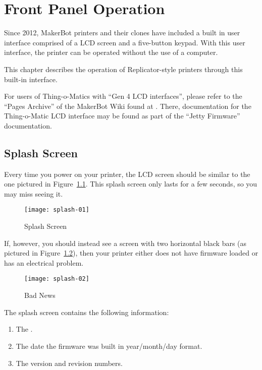 
\chapter{Front Panel Operation}\label{chap:whatever}

Since 2012, MakerBot printers and their clones have included a built in user
interface comprised of a \gls{LCD} screen and a five-button keypad.  With this
user interface, the printer can be operated without the use of a computer.

This chapter describes the operation of Replicator-style printers through this
built-in interface.

For users of Thing-o-Matics with ``Gen 4 LCD interfaces'', please refer
to the ``Pages Archive'' of the MakerBot Wiki found at
.  There, documentation for the Thing-o-Matic
LCD interface may be found as part of the ``\gls{Jetty Firmware}''
documentation.


\section{Splash Screen}\label{sec:Splash}

Every time you power on your printer, the \gls{LCD} screen should be similar to the one pictured in Figure~\ref{fig:splash}.  This splash screen only lasts for a few seconds, so you may miss seeing it.

\begin{figure}[!htbp]
  \centering
    \texttt{[image: splash-01]}
    \caption{Splash Screen}
  \label{fig:splash}
\end{figure}

If, however, you should instead see a screen with two horizontal black bars (as pictured in Figure~\ref{fig:error}), then your printer either does not have \gls{firmware} loaded or has an electrical problem.

\begin{figure}[!htbp]
  \centering
    \texttt{[image: splash-02]}
    \caption{Bad News}
  \label{fig:error}
\end{figure}

The splash screen contains the following information:

\begin{enumerate}
\item The .
\item The date the firmware was built in year/month/day format.
\item The version and revision numbers.
\end{enumerate}

